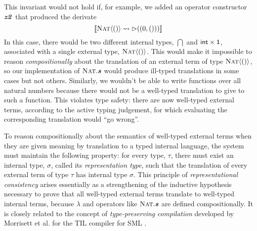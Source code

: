 This invariant would not hold if, for example, we added an operator constructor $\opvar{z2}$ that produced the derivate $$\tden{\titerm{(0, ())}}{\ttype{Nat}{\tunit}}$$
\noindent
In this case, there would be two different internal types, $\dint$ and $\dpair{\dint}{\dunit}$,  associated with a single external type, $\ttype{Nat}{\tunit}$. This would make it impossible to reason \emph{compositionally} about the translation of an external term of type $\ttype{Nat}{\tunit}$, so our implementation of $\fvar{Nat}.\opvar{s}$ would produce ill-typed translations in some cases but not others. Similarly, we wouldn't be able to write functions over all natural numbers because there would not be a well-typed translation to give to such a function. This violates type safety: there are now well-typed external terms, according to the active typing judgement, for which evaluating the corresponding translation would ``go wrong''. 

To reason compositionally about the semantics of well-typed external terms when they are given meaning by translation to a typed internal language, the system must maintain the following property: for every  type, $\tau$, there must exist an internal type, $\sigma$, called its \emph{representation type}, such that the translation of every external term of type $\tau$ has internal type $\sigma$. This principle of \emph{representational consistency} arises essentially as a strengthening of the inductive hypothesis necessary to prove that all well-typed external terms translate to well-typed internal terms, because $\lambda$ and operators like $\fvar{Nat}.\opvar{s}$ are defined compositionally. It is closely related to the concept of \emph{type-preserving compilation} developed by Morrisett et al. for the TIL compiler for SML \cite{tarditi+:til-OLD}. %

